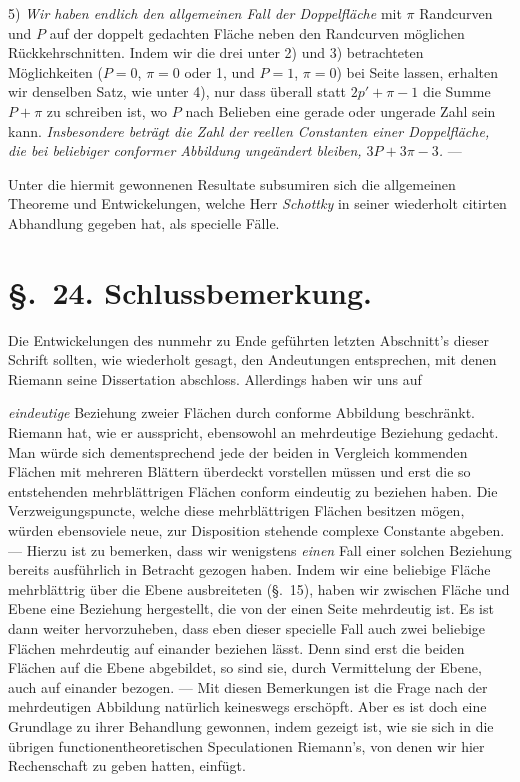 \documentclass{article}
\begin{document}
5) \emph{Wir haben endlich den allgemeinen Fall der Doppelfläche} mit $\pi$ Randcurven und $P$ auf der doppelt gedachten Fläche neben den Randcurven möglichen Rückkehrschnitten. Indem wir die drei unter 2) und 3) betrachteten Möglichkeiten ($P = 0$, $\pi = 0$ oder 1, und $P = 1$, $\pi = 0$) bei Seite lassen, erhalten wir denselben Satz, wie unter 4), nur dass überall statt $2p' + \pi - 1$ die Summe $P + \pi$ zu schreiben ist, wo $P$ nach Belieben eine gerade oder ungerade Zahl sein kann. \emph{Insbesondere beträgt die Zahl der reellen Constanten einer Doppelfläche, die bei beliebiger conformer Abbildung ungeändert bleiben, $3P + 3\pi - 3$.} ---

Unter die hiermit gewonnenen Resultate subsumiren sich die allgemeinen Theoreme und Entwickelungen, welche Herr \emph{Schottky} in seiner wiederholt citirten Abhandlung gegeben hat, als specielle Fälle.

\section*{§.~24. Schlussbemerkung.}

Die Entwickelungen des nunmehr zu Ende geführten letzten Abschnitt's dieser Schrift sollten, wie wiederholt gesagt, den Andeutungen entsprechen, mit denen Riemann seine Dissertation abschloss. Allerdings haben wir uns auf

\emph{eindeutige} Beziehung zweier Flächen durch conforme Abbildung beschränkt. Riemann hat, wie er ausspricht, ebensowohl an mehrdeutige Beziehung gedacht. Man würde sich dementsprechend jede der beiden in Vergleich kommenden Flächen mit mehreren Blättern überdeckt vorstellen müssen und erst die so entstehenden mehrblättrigen Flächen conform eindeutig zu beziehen haben. Die Verzweigungspuncte, welche diese mehrblättrigen Flächen besitzen mögen, würden ebensoviele neue, zur Disposition stehende complexe Constante abgeben. --- Hierzu ist zu bemerken, dass wir wenigstens \emph{einen} Fall einer solchen Beziehung bereits ausführlich in Betracht gezogen haben. Indem wir eine beliebige Fläche mehrblättrig über die Ebene ausbreiteten (§.~15), haben wir zwischen Fläche und Ebene eine Beziehung hergestellt, die von der einen Seite mehrdeutig ist. Es ist dann weiter hervorzuheben, dass eben dieser specielle Fall auch zwei beliebige Flächen mehrdeutig auf einander beziehen lässt. Denn sind erst die beiden Flächen auf die Ebene abgebildet, so sind sie, durch Vermittelung der Ebene, auch auf einander bezogen. --- Mit diesen Bemerkungen ist die Frage nach der mehrdeutigen Abbildung natürlich keineswegs erschöpft. Aber es ist doch eine Grundlage zu ihrer Behandlung gewonnen, indem gezeigt ist, wie sie sich in die übrigen functionentheoretischen Speculationen Riemann's, von denen wir hier Rechenschaft zu geben hatten, einfügt.
\end{document}
